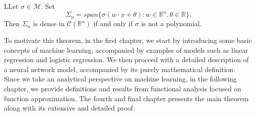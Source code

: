 \documentclass[../main.tex]{subfiles}
\begin{document}
\begin{theo}
	   LLet $ \sigma \in  \mathcal{M}$. Set
	$$ \Sigma_n = span\{\sigma(w\cdot x + \theta) : w\in \mathbb{R}^n, \theta \in \mathbb{R} \}.$$
	Then $\Sigma_n$ is dense in $\mathcal{C}(\mathbb{R}^n)$ if and only if $\sigma$ is not a polynomial. \\ 
\end{theo}
\vspace{\baselineskip} 

\noindent To motivate this theorem, in the first chapter, we start by introducing some basic concepts of machine learning, accompanied by examples of models such as linear regression and logistic regression. We then proceed with a detailed description of a neural network model, accompanied by its purely mathematical definition.  Since we take an analytical perspective on machine learning, in the following chapter, we provide definitions and results from functional analysis focused on function approximation. The fourth and final chapter presents the main theorem along with its extensive and detailed proof. 
\end{document}
